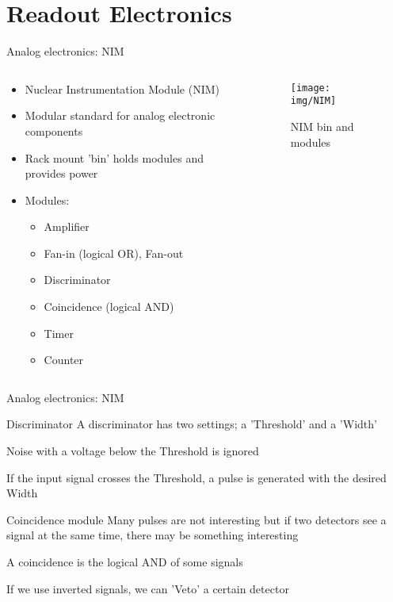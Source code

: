 \documentclass[9pt]{beamer}
\begin{document}
\section{Readout Electronics}
\begin{frame}{Analog electronics: NIM}
  \begin{columns}
    \begin{column}{.4\textwidth}
    \vspace*{-0.5cm}
    \begin{itemize}
        \item Nuclear Instrumentation Module (NIM)
        \item Modular standard for analog electronic components
        \item Rack mount 'bin' holds modules and provides power
        \item Modules:
        \begin{itemize}
            \item Amplifier
            \item Fan-in (logical OR), Fan-out
            \item Discriminator
            \item Coincidence (logical AND)
            \item Timer
            \item Counter
        \end{itemize}
    \end{itemize}
    \end{column}
    \begin{column}{.6\textwidth}
    \vspace*{-0.5cm}
    \begin{figure}\texttt{[image: img/NIM]}\vspace*{-0.2cm}\caption{NIM bin and modules}\end{figure}\vspace*{-1cm}
    \end{column}
  \end{columns}
\end{frame}

\begin{frame}{Analog electronics: NIM}
  \begin{block}{Discriminator}
    A discriminator has two settings; a 'Threshold' and a 'Width'

    Noise with a voltage below the Threshold is ignored

    If the input signal crosses the Threshold, a pulse is generated with the desired Width
  \end{block}
  \begin{block}{Coincidence module}
    Many pulses are not interesting but if two detectors see a signal at the same time, there may be something interesting

    A coincidence is the logical AND of some signals

    If we use inverted signals, we can 'Veto' a certain detector
  \end{block}
\end{frame}
\end{document}
